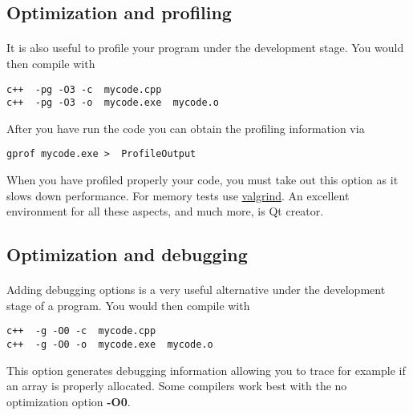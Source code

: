 \documentclass[%
oneside,                 %
final,                   %
10pt]{article}
\begin{document}
\subsection*{Optimization and profiling}

\paragraph{}
It is also useful to profile your program under the development stage.
You would then compile with 
\begin{verbatim}
c++  -pg -O3 -c  mycode.cpp
c++  -pg -O3 -o  mycode.exe  mycode.o
\end{verbatim}
After you have run the code you can obtain the profiling information via
\begin{verbatim}
gprof mycode.exe >  ProfileOutput
\end{verbatim}
When you have profiled properly your code, you must take out this option as it 
slows down performance.
For memory tests use \href{{http://www.valgrind.org}}{valgrind}. An excellent environment for all these aspects, and much  more, is  Qt creator.



\subsection*{Optimization and debugging}

\paragraph{}
Adding debugging options is a very useful alternative under the development stage of a program.
You would then compile with 
\begin{verbatim}
c++  -g -O0 -c  mycode.cpp
c++  -g -O0 -o  mycode.exe  mycode.o
\end{verbatim}
This option generates debugging information allowing you to trace for example if an array is properly allocated. Some compilers work best with the no optimization option \textbf{-O0}.
\end{document}
